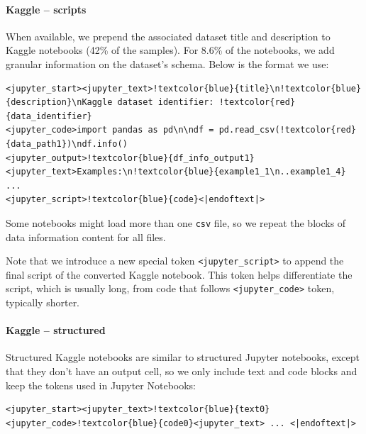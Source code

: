 \documentclass[10pt]{article} %
\begin{document}
\paragraph{Kaggle -- scripts} When available, we prepend the associated dataset title and description to Kaggle notebooks (42\% of the samples). For 8.6\% of the notebooks, we add granular information on the dataset's schema. Below is the format we use:

\begin{Verbatim}[commandchars=!\{\}]
<jupyter_start><jupyter_text>!textcolor{blue}{title}\n!textcolor{blue}{description}\nKaggle dataset identifier: !textcolor{red}{data_identifier}
<jupyter_code>import pandas as pd\n\ndf = pd.read_csv(!textcolor{red}{data_path1})\ndf.info()
<jupyter_output>!textcolor{blue}{df_info_output1}
<jupyter_text>Examples:\n!textcolor{blue}{example1_1\n..example1_4}
...
<jupyter_script>!textcolor{blue}{code}<|endoftext|> 
\end{Verbatim}
Some notebooks might load more than one \texttt{csv} file, so we repeat the blocks of data information content for all files.

Note that we introduce a new special token \texttt{<jupyter\_script>} to append the final script of the converted Kaggle notebook. This token helps differentiate the script, which is usually long, from code that follows \texttt{<jupyter\_code>} token, typically shorter.

\paragraph{Kaggle -- structured} Structured Kaggle notebooks are similar to structured Jupyter notebooks, except that they don't have an output cell, so we only include text and code blocks and keep the tokens used in Jupyter Notebooks:

\begin{Verbatim}[commandchars=!\{\}]
<jupyter_start><jupyter_text>!textcolor{blue}{text0}<jupyter_code>!textcolor{blue}{code0}<jupyter_text> ... <|endoftext|> 
\end{Verbatim}
\end{document}
